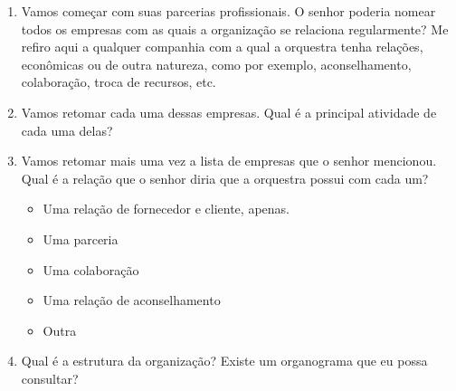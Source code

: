 \documentclass[a4paper, 12pt, openright, oneside, german, french, english, brazil]{abntex2}
\begin{document}
	\vspace{1cm}
	\begin{enumerate}
		
		\item Vamos começar com suas parcerias profissionais. O senhor poderia nomear todos os empresas com as quais a organização se relaciona regularmente? Me refiro aqui a qualquer companhia com a qual a orquestra tenha relações, econômicas ou de outra natureza, como por exemplo, aconselhamento, colaboração, troca de recursos, etc.
		
		
		\item Vamos retomar cada uma dessas empresas. Qual é a principal atividade de cada uma delas?
		
		
		\item Vamos retomar mais uma vez a lista de empresas que o senhor mencionou. Qual é a relação que o senhor diria que a orquestra possui com cada um?
		\begin{itemize}
			\item Uma relação de fornecedor e cliente, apenas.
			\item Uma parceria
			\item Uma colaboração
			\item Uma relação de aconselhamento
			\item Outra
		\end{itemize}
		
		\item Qual é a estrutura da organização? Existe um organograma que eu possa consultar?
		
		

\end{enumerate}
\end{document}
